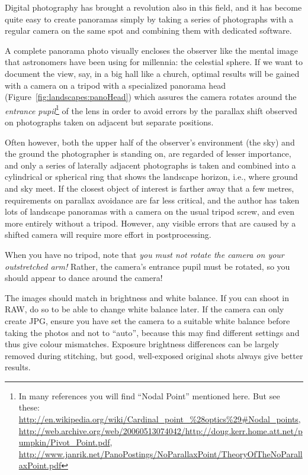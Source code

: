 Digital photography has brought a revolution also in this field, and it has
become quite easy to create panoramas simply by taking a series of
photographs with a regular camera on the same spot and combining them
with dedicated software.

A complete panorama photo visually encloses the observer like the
mental image that astronomers have been using for millennia: the
celestial sphere. If we want to document the view, say, in a big hall
like a church, optimal results will be gained with a camera on a
tripod with a specialized panorama head (Figure~\ref{fig:landscapes:panoHead}) which assures the camera
rotates around the \emph{entrance pupil}\footnote{In many references
  you will find ``Nodal Point'' mentioned here. But see these:
  \url{http://en.wikipedia.org/wiki/Cardinal_point_\%28optics\%29\#Nodal_points},
  \url{http://web.archive.org/web/20060513074042/http://doug.kerr.home.att.net/pumpkin/Pivot_Point.pdf},
  \url{http://www.janrik.net/PanoPostings/NoParallaxPoint/TheoryOfTheNoParallaxPoint.pdf}
} of the lens in order to avoid errors by the parallax shift observed
on photographs taken on adjacent but separate positions.


Often however, both the upper half of the observer's environment (the
sky) and the ground the photographer is standing on, are regarded of
lesser importance, and only a series of laterally adjacent photographs
is taken and combined into a cylindrical or spherical ring that shows
the landscape horizon, i.e.,  where ground and sky meet. If the
closest object of interest is farther away that a few metres,
requirements on parallax avoidance are far less critical, and the author
has taken lots of landscape panoramas with a camera on the usual
tripod screw, and even more entirely without a tripod. However, any visible errors
that are caused by a shifted camera will require more effort in
postprocessing.

When you have no tripod, note that \emph{you must not rotate the
  camera on your outstretched arm!} Rather, the camera's entrance
pupil must be rotated, so you should appear to dance around the
camera!

The images should match in brightness and white balance. If you can
shoot in RAW, do so to be able to change white balance later. If the
camera can only create JPG, ensure you have set the camera to a suitable white balance
before taking the photos and not to ``auto'', because this may find different settings and
thus give colour mismatches. Exposure brightness differences can be
largely removed during stitching, but good, well-exposed original
shots always give better results.

